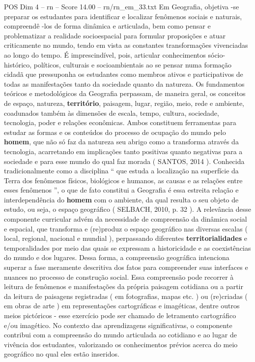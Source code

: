 \begin{textsample}{POS Dim 4 – rn – Score 14.00 – rn/rn\_em\_33.txt}
Em Geografia, objetiva -se preparar os estudantes para identificar e localizar fenômenos sociais e naturais, compreendê -los de forma dinâmica e articulada, bem como pensar e problematizar a realidade socioespacial para formular proposições e atuar criticamente no mundo, tendo em vista as constantes transformações vivenciadas ao longo do tempo.
É imprescindível, pois, articular conhecimentos sócio-histórico, políticos, culturais e socioambientais ao se pensar numa formação cidadã que pressuponha os estudantes como membros ativos e participativos de todas as manifestações tanto da sociedade quanto da natureza.
Os fundamentos teóricos e metodológicos da Geografia perpassam, de maneira geral, os conceitos de espaço, natureza, \textbf{território}, paisagem, lugar, região, meio, rede e ambiente, coadunados também às dimensões de escala, tempo, cultura, sociedade, tecnologia, poder e relações econômicas.
Ambos constituem ferramentas para estudar as formas e os conteúdos do processo de ocupação do mundo pelo \textbf{homem}, que não só faz da natureza seu abrigo como a transforma através da tecnologia, acarretando em implicações tanto positivas quanto negativas para a sociedade e para esse mundo do qual faz morada ( SANTOS, 2014 ).
Conhecida tradicionalmente como a disciplina “ que estuda a localização na superfície da Terra dos fenômenos físicos, biológicos e humanos, as causas e as relações entre esses fenômenos ”, o que de fato constitui a Geografia é essa estreita relação e interdependência do \textbf{homem} com o ambiente, da qual resulta o seu objeto de estudo, ou seja, o espaço geográfico ( SELBACH, 2010, p. 32 ).
A relevância desse componente curricular advém da necessidade de compreensão da dinâmica social e espacial, que transforma e (re)produz o espaço geográfico nas diversas escalas ( local, regional, nacional e mundial ), perpassando diferentes \textbf{territorialidades} e temporalidades por meio das quais se expressam a historicidade e as coexistências do mundo e dos lugares.
Dessa forma, a compreensão geográfica intenciona superar a fase meramente descritiva dos fatos para compreender suas interfaces e nuances no processo de construção social.
Essa compreensão pode recorrer à leitura de fenômenos e manifestações da própria paisagem cotidiana ou a partir da leitura de paisagens registradas ( em fotografias, mapas etc. ) ou (re)criadas ( em obras de arte ) em representações cartográficas e imagéticas, dentre outros meios pictóricos - esse exercício pode ser chamado de letramento cartográfico e/ou imagético.
No contexto das aprendizagens significativas, o componente contribui com a compreensão do mundo articulada ao cotidiano e ao lugar de vivência dos estudantes, valorizando os conhecimentos prévios acerca do meio geográfico no qual eles estão inseridos.

\end{textsample}
